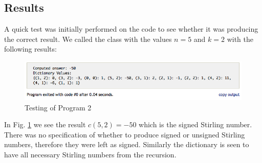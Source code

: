 \subsection{Results} %
\label{sub:results2}
A quick test was initially performed on the code to see whether it was producing the correct result. We called the class with the values $n=5$ and $k=2$ with the following results:
\begin{figure}[H]
    \centering
        \includegraphics[width=6in, trim=0 .4in 0 0]{include/prob2test.png}
    \caption{Testing of Program 2}
    \label{fig:include_prob2test}
\end{figure}

\noindent In Fig. \ref{fig:include_prob2test} we see the result $c(5,2)=-50$ which is the signed Stirling number. There was no specification of whether to produce signed or unsigned Stirling numbers, therefore they were left as signed. Similarly the dictionary is seen to have all necessary Stirling numbers from the recursion.

